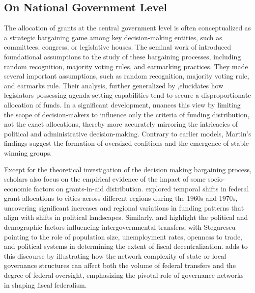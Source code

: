 \subsection{On National Government Level}

The allocation of grants at the central government level is often conceptualized as a strategic bargaining game among key decision-making entities, such as committees, congress, or legislative houses. The seminal work of \Textcite{baron1989bargaining} introduced foundational assumptions to the study of these bargaining processes, including random recognition, majority voting rules, and earmarking practices.  They made several important assumptions, such as random recognition, majority voting rule, and earmarks rule. Their analysis, further generalized by \Textcite{banks2006general},elucidates how legislators possessing agenda-setting capabilities tend to secure a disproportionate allocation of funds. In a significant development,  \Textcite{martin2018dividing} nuances this view by limiting the scope of decision-makers to influence only the criteria of funding distribution, not the exact allocations, thereby more accurately mirroring the intricacies of political and administrative decision-making. Contrary to earlier models, Martin's findings suggest the formation of oversized coalitions and the emergence of stable winning groups.

Except for the theoretical investigation of the decision making bargaining process, scholars also focus on the empirical evidence of the impact of some socio-economic factors on grants-in-aid distribution. \Textcite{markusen1981benefits} explored temporal shifts in federal grant allocations to cities across different regions during the 1960s and 1970s, uncovering significant increases and regional variations in funding patterns that align with shifts in political landscapes. Similarly, \Textcite{wallis1987employment} and \Textcite{stegarescu2006decentralised} highlight the political and demographic factors influencing intergovernmental transfers, with Stegarescu pointing to the role of population size, unemployment rates, openness to trade, and political systems in determining the extent of fiscal decentralization.  \Textcite{kasdin2016decision} adds to this discourse by illustrating how the network complexity of state or local governance structures can affect both the volume of federal transfers and the degree of federal oversight, emphasizing the pivotal role of governance networks in shaping fiscal federalism.

